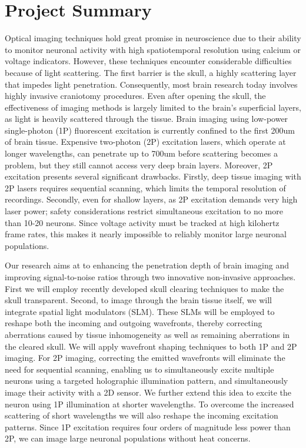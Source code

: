 \section*{Project Summary}



Optical imaging techniques hold great promise in neuroscience due to their ability to monitor neuronal activity with high spatiotemporal resolution using calcium or voltage indicators. However, these techniques encounter considerable difficulties because of light scattering. The first barrier is the skull, a highly scattering layer that impedes light penetration. Consequently, most brain research today involves highly invasive craniotomy procedures. Even after opening the skull, the effectiveness of imaging methods is largely limited to the brain's superficial layers, as light is heavily scattered through the tissue.
Brain imaging using low-power single-photon (1P) fluorescent excitation is currently confined to the first 200um of brain tissue. Expensive two-photon (2P) excitation lasers, which operate at longer wavelengths, can penetrate up to 700um before scattering becomes a problem, but they still cannot access very deep brain layers. Moreover, 2P excitation presents several significant drawbacks. Firstly, deep tissue imaging with 2P lasers requires sequential scanning, which limits the temporal resolution of recordings. Secondly, even for shallow layers, as 2P excitation demands very high laser power; safety considerations restrict simultaneous excitation to no more than 10-20 neurons. Since voltage activity must be tracked at high kilohertz frame rates, this makes it nearly impossible to reliably monitor large neuronal populations.

Our research aims at to enhancing the penetration depth of brain imaging and improving signal-to-noise ratios through two innovative non-invasive approaches.
First we will employ recently developed skull clearing techniques to make the skull transparent.
 Second, to image through the brain tissue itself, we will integrate spatial light modulators (SLM). These SLMs will be employed to reshape both the incoming and outgoing wavefronts, thereby correcting aberrations caused by tissue inhomogeneity as well as remaining aberrations in the cleared skull. 
We will apply wavefront shaping techniques to both 1P and 2P imaging. For 2P imaging, correcting the emitted wavefronts will eliminate the need for sequential scanning, enabling us to simultaneously excite multiple neurons using a targeted holographic illumination pattern, and simultaneously image their activity with a 2D sensor.
We further extend this idea to excite the neuron using 1P illumination at shorter wavelengths. To overcome the increased scattering of short wavelengths we will also reshape the incoming excitation patterns.
 Since 1P excitation requires four orders of magnitude less power than 2P, we can image large neuronal populations without heat concerns.
